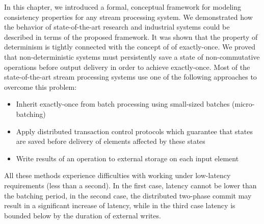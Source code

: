In this chapter, we introduced a formal, conceptual framework for modeling consistency properties for any stream processing system. We demonstrated how the behavior of state-of-the-art research and industrial systems could be described in terms of the proposed framework. It was shown that the property of determinism is tightly connected with the concept of of exactly-once. We proved that non-deterministic systems must persistently save a state of non-commutative operations before output delivery in order to achieve exactly-once. Most of the state-of-the-art stream processing systems use one of the following approaches to overcome this problem: 

\begin{itemize}
    \item Inherit exactly-once from batch processing using small-sized batches (micro-batching)
    \item Apply distributed transaction control protocols which guarantee that states are saved before delivery of elements affected by these states
    \item Write results of an operation to external storage on each input element
\end{itemize}

All these methods experience difficulties with working under low-latency requirements (less than a second). In the first case, latency cannot be lower than the batching period, in the second case, the distributed two-phase commit may result in a significant increase of latency, while in the third case latency is bounded below by the duration of external writes.
